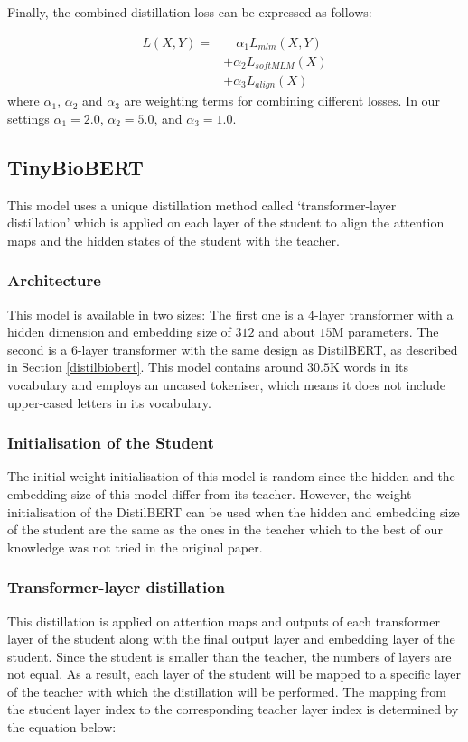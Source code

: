 \documentclass{article}
\begin{document}
Finally, the combined distillation loss can be expressed as follows:

\begin{align} 
    L(X , Y) = &\hspace{12pt}\alpha_{1}L_{mlm}(X , Y) \\
               & + \alpha_{2}L_{softMLM}(X) \nonumber \\ 
               & + \alpha_{3}L_{align}(X) \nonumber
\end{align}
where $\alpha_1$, $\alpha_2$ and $\alpha_3$ are weighting terms for combining different losses. In our settings $\alpha_1 = 2.0$, $\alpha_2 = 5.0$, and $\alpha_3 = 1.0$.

\subsection{TinyBioBERT}
This model uses a unique distillation method called `transformer-layer distillation' which is applied on each layer of the student to align the attention maps and the hidden states of the student with the teacher.

\subsubsection{Architecture}
This model is available in two sizes: The first one is a $4$-layer transformer with a hidden dimension and embedding size of $312$ and about $15$M parameters.
The second is a $6$-layer transformer with the same design as DistilBERT, as  described in Section \ref{distilbiobert}.
This model contains around $30.5$K words in its vocabulary and employs an uncased tokeniser, which means it does not include upper-cased letters in its vocabulary. 

\subsubsection{Initialisation of the Student}
The initial weight initialisation of this model is random since the hidden and the embedding size of this model differ from its teacher. However, the weight initialisation of the DistilBERT can be used when the hidden and embedding size of the student are the same as the ones in the teacher which to the best of our knowledge was not tried in the original paper.

\subsubsection{Transformer-layer distillation}
This distillation is applied on attention maps and outputs of each transformer layer of the student along with the final output layer and embedding layer of the student. Since the student is smaller than the teacher, the numbers of layers are not equal. As a result, each layer of the student will be mapped to a specific layer of the teacher with which the distillation will be performed. The mapping from the student layer index to the corresponding teacher layer index is determined by the equation below:
\end{document}
